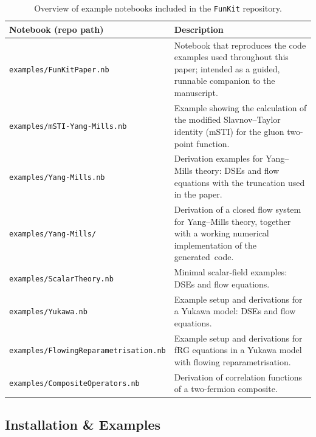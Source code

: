 \documentclass[preprint,10pt,sort&compress]{elsarticle}
\newcommand{\FunKit}{\texttt{FunKit}\xspace}
\begin{document}
%
\begin{table}[t]
	\begin{tcolorbox}[title=Available example notebooks,
		title filled=false,
		colback=pastelblue!5!white,
		colframe=pastelblue,
		fonttitle=\bfseries]
		\small
		\begin{tabular}{p{6.0cm} p{9.2cm}}
			\toprule
			\textbf{Notebook (repo path)} & \textbf{Description} \\
			\midrule
			\texttt{examples/FunKitPaper.nb} & Notebook that reproduces the code examples used throughout this paper; intended as a guided, runnable companion to the manuscript. \\[1ex]
			\texttt{examples/mSTI-Yang-Mills.nb} & Example showing the calculation of the modified Slavnov--Taylor identity (mSTI) for the gluon two-point function. \\[1ex]
			\texttt{examples/Yang-Mills.nb} & Derivation examples for Yang–Mills theory: DSEs and flow equations with the truncation used in the paper. \\[1ex]
			\texttt{examples/Yang-Mills/} & Derivation of a closed flow system for Yang--Mills theory, together with a working numerical implementation of the generated~code. \\[1ex]
			\texttt{examples/ScalarTheory.nb} & Minimal scalar-field examples: DSEs and flow equations. \\[1ex]
			\texttt{examples/Yukawa.nb} & Example setup and derivations for a Yukawa model: DSEs and flow equations.  \\[1ex]
			\texttt{examples/FlowingReparametrisation.nb} & Example setup and derivations for fRG equations in a Yukawa model with flowing reparametrisation.\\
			\texttt{examples/CompositeOperators.nb} & Derivation of correlation functions of a two-fermion composite.
		\end{tabular}
	\end{tcolorbox}
	\caption{Overview of example notebooks included in the \FunKit repository.}
	\label{tab:examples}
\end{table}


\subsection*{Installation \& Examples}
\end{document}
